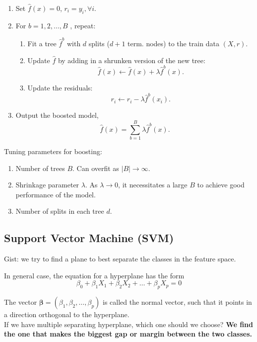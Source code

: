 \documentclass{article}
\begin{document}
\begin{enumerate}
    \item  Set $\hat{f}(x) = 0$, $r_i = y_i, \forall i$.
    \item For $b = 1, 2, ..., B$ , repeat:
    \begin{enumerate}
        \item Fit a tree $\hat{f}^b$ with $d$ splits ($d + 1$ term. nodes) to the train data $(X, r)$.
        \item Update $\hat{f}$ by adding in a shrunken version of the new tree: \[\hat{f}(x) \leftarrow \hat{f}(x) + \lambda \hat{f}^b(x).\]
        \item Update the residuals: \[r_i \leftarrow r_i - \lambda \hat{f}^b(x_i).\]
    \end{enumerate}
\item Output the boosted model, \[\hat{f}(x) = \sum_{b=1}^B \lambda \hat{f}^b (x).\]
\end{enumerate}

Tuning parameters for boosting:

\begin{enumerate}
    \item Number of trees $B$. Can overfit as $|B| \rightarrow \infty$.
    \item Shrinkage parameter $\lambda$. As $\lambda \rightarrow 0$, it necessitates a large $B$ to achieve good performance of the model.
    \item Number of splits in each tree $d$.
\end{enumerate}

\subsection{Support Vector Machine (SVM)}

Gist: we try to find a plane to best separate the classes in the feature space.

In general case, the equation for a hyperplane has the form \[\beta_0 + \beta_1X_1 + \beta_2X_2 + \dots + \beta_pX_p = 0\]

The vector $\boldsymbol{\beta} = (\beta_1, \beta_2, \dots, \beta_p)$ is called the normal vector, such that it points in a direction orthogonal to the hyperplane.\\

If we have multiple separating hyperplane, which one should we choose? \textbf{We find the one that makes the biggest gap or margin between the two classes.} \\
\end{document}
